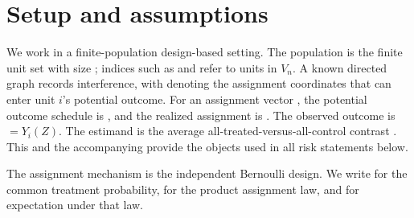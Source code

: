 \section{Setup and assumptions}

We work in a finite-population design-based setting. The population is the finite unit set  with size ; indices such as  and  refer to units in \(V_n\). A known directed graph  records interference, with  denoting the assignment coordinates that can enter unit \(i\)'s potential outcome. For an assignment vector , the potential outcome schedule is , and the realized assignment is . The observed outcome is  \(=Y_i(Z)\). The estimand is the average all-treated-versus-all-control contrast . This  and the accompanying  provide the objects used in all risk statements below.

The assignment mechanism is the independent Bernoulli design. We write  for the common treatment probability,  for the product assignment law, and  for expectation under that law.

